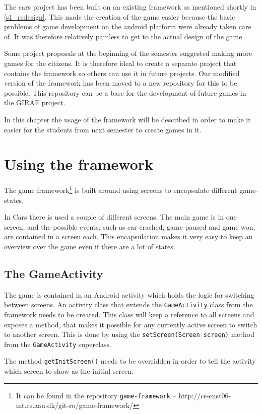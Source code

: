 \label{common_game_framework}
The cars project has been built on an existing framework as mentioned shortly in \cref{s1_redesign}. 
This made the creation of the game easier because the basic problems of game development on the android platform were already taken care of.
It was therefore relatively painless to get to the actual design of the game. 

Some project proposals at the beginning of the semester suggested making more games for the citizens.
It is therefore ideal to create a separate project that contains the framework so others can use it in future projects.
Our modified version of the framework has been moved to a new repository for this to be possible.
This repository can be a base for the development of future games in the GIRAF project.

In this chapter the usage of the framework will be described in order to make it easier for the students from next semester to create games in it.

\section{Using the framework}
The game framework\footnote{It can be found in the repository \lstinline|game-framework| -- http://cs-cust06-int.cs.aau.dk/git-ro/game-framework/}
is built around using screens to encapsulate different game-states.

In Cars there is used a couple of different screens.
The main game is in one screen, and the possible events, such as car crashed, game paused and game won, are contained in a screen each.
This encapsulation makes it very easy to keep an overview over the game even if there are a lot of states.

\subsection{The GameActivity}
The game is contained in an Android activity which holds the logic for switching between screens.
An activity class that extends the \lstinline|GameActivity| class from the framework needs to be created.
This class will keep a reference to all screens and exposes a method, that makes it possible for any currently active screen to switch to another screen.
This is done by using the \lstinline|setScreen(Screen screen)| method from the \lstinline|GameActivity| superclass.

The method \lstinline|getInitScreen()| needs to be overridden in order to tell the activity which screen to show as the initial screen.

